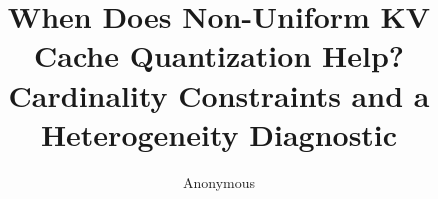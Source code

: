 \documentclass[11pt]{article}
\title{When Does Non-Uniform KV Cache Quantization Help?\\Cardinality Constraints and a Heterogeneity Diagnostic}
\author{Anonymous}
\begin{document}
\maketitle

\begin{abstract}

\end{abstract}











\end{document}
